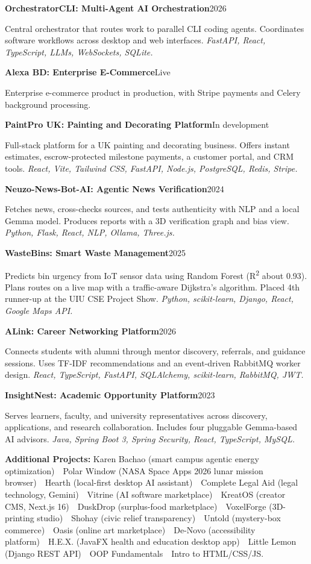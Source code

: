 \documentclass[10pt,a4paper]{article}
\newcommand{\entry}[2]{\needspace{3\baselineskip}\textbf{#1}\hfill #2\par}
\newcommand{\proj}[3]{\vspace{2pt}\entry{#1}{#2}#3\par}
\newcommand{\sep}{\ \textbullet\ }
\begin{document}
\proj{OrchestratorCLI: Multi-Agent AI Orchestration}{2026}{Central orchestrator that routes work to parallel CLI coding agents. Coordinates software workflows across desktop and web interfaces. \textit{FastAPI, React, TypeScript, LLMs, WebSockets, SQLite.}}
\proj{Alexa BD: Enterprise E-Commerce}{Live}{Enterprise e-commerce product in production, with Stripe payments and Celery background processing.}
\proj{PaintPro UK: Painting and Decorating Platform}{In development}{Full-stack platform for a UK painting and decorating business. Offers instant estimates, escrow-protected milestone payments, a customer portal, and CRM tools. \textit{React, Vite, Tailwind CSS, FastAPI, Node.js, PostgreSQL, Redis, Stripe.}}
\proj{Neuzo-News-Bot-AI: Agentic News Verification}{2024}{Fetches news, cross-checks sources, and tests authenticity with NLP and a local Gemma model. Produces reports with a 3D verification graph and bias view. \textit{Python, Flask, React, NLP, Ollama, Three.js.}}
\proj{WasteBins: Smart Waste Management}{2025}{Predicts bin urgency from IoT sensor data using Random Forest (R\textsuperscript{2} about 0.93). Plans routes on a live map with a traffic-aware Dijkstra's algorithm. Placed 4th runner-up at the UIU CSE Project Show. \textit{Python, scikit-learn, Django, React, Google Maps API.}}
\proj{ALink: Career Networking Platform}{2026}{Connects students with alumni through mentor discovery, referrals, and guidance sessions. Uses TF-IDF recommendations and an event-driven RabbitMQ worker design. \textit{React, TypeScript, FastAPI, SQLAlchemy, scikit-learn, RabbitMQ, JWT.}}
\proj{InsightNest: Academic Opportunity Platform}{2023}{Serves learners, faculty, and university representatives across discovery, applications, and research collaboration. Includes four pluggable Gemma-based AI advisors. \textit{Java, Spring Boot 3, Spring Security, React, TypeScript, MySQL.}}
\vspace{3pt}
\textbf{Additional Projects:} Karen Bachao (smart campus agentic energy optimization)\sep Polar Window (NASA Space Apps 2026 lunar mission browser)\sep Hearth (local-first desktop AI assistant)\sep Complete Legal Aid (legal technology, Gemini)\sep Vitrine (AI software marketplace)\sep KreatOS (creator CMS, Next.js 16)\sep DuskDrop (surplus-food marketplace)\sep VoxelForge (3D-printing studio)\sep Shohay (civic relief transparency)\sep Untold (mystery-box commerce)\sep Oasis (online art marketplace)\sep De-Novo (accessibility platform)\sep H.E.X. (JavaFX health and education desktop app)\sep Little Lemon (Django REST API)\sep OOP Fundamentals\sep Intro to HTML/CSS/JS.
\end{document}
